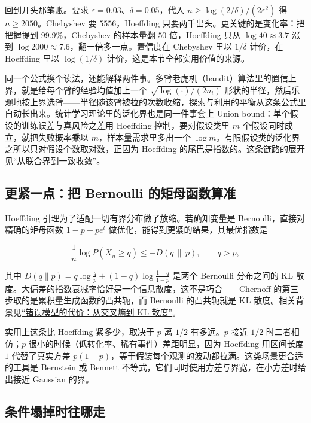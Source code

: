 回到开头那笔账。要求 \(\varepsilon=0.03\)、\(\delta=0.05\)，代入 \(n\ge\log(2/\delta)/(2\varepsilon^2)\) 得 \(n\ge2050\)。Chebyshev 要 \(5556\)，Hoeffding 只要两千出头。更关键的是变化率：把把握提到 \(99.9\%\)，Chebyshev 的样本量翻 \(50\) 倍，Hoeffding 只从 \(\log40\approx3.7\) 涨到 \(\log2000\approx7.6\)，翻一倍多一点。置信度在 Chebyshev 里以 \(1/\delta\) 计价，在 Hoeffding 里以 \(\log(1/\delta)\) 计价，这是本节全部实用价值的来源。

同一个公式换个读法，还能解释两件事。多臂老虎机（bandit）算法里的置信上界，就是给每个臂的经验均值加上一个 \(\sqrt{\log(\cdot)/(2n_i)}\) 形状的半径，然后乐观地按上界选臂——半径随该臂被拉的次数收缩，探索与利用的平衡从这条公式里自动长出来。统计学习理论里的泛化界也是同一件事套上 Union bound：单个假设的训练误差与真风险之差用 Hoeffding 控制，要对假设类里 \(m\) 个假设同时成立，就把失败概率乘以 \(m\)，样本量需求里多出一个 \(\log m\)。有限假设类的泛化界之所以只对假设个数取对数，正因为 Hoeffding 的尾巴是指数的。这条链路的展开见\hyperref[sec:13-Machine-Learning/10-Learning-Theory/02]{``从联合界到一致收敛''}。

\subsection{更紧一点：把 Bernoulli 的矩母函数算准}

Hoeffding 引理为了适配一切有界分布做了放缩。若确知变量是 Bernoulli，直接对精确的矩母函数 \(1-p+pe^t\) 做优化，能得到更紧的结果，其最优指数是

\[
\frac1n\log P(\bar X_n\ge q)\le-D(q\,\|\,p),\qquad q>p,
\]

其中 \(D(q\|p)=q\log\frac qp+(1-q)\log\frac{1-q}{1-p}\) 是两个 Bernoulli 分布之间的 KL 散度。大偏差的指数衰减率恰好是一个信息散度，这不是巧合——Chernoff 的第三步取的是累积量生成函数的凸共轭，而 Bernoulli 的凸共轭就是 KL 散度。相关背景见\hyperref[sec:07-Information-Theory/03-Divergences/01]{``错误模型的代价：从交叉熵到 KL 散度''}。

实用上这条比 Hoeffding 紧多少，取决于 \(p\) 离 \(1/2\) 有多远。\(p\) 接近 \(1/2\) 时二者相仿；\(p\) 很小的时候（低转化率、稀有事件）差距明显，因为 Hoeffding 用区间长度 \(1\) 代替了真实方差 \(p(1-p)\)，等于假装每个观测的波动都拉满。这类场景更合适的工具是 Bernstein 或 Bennett 不等式，它们同时使用方差与界宽，在小方差时给出接近 Gaussian 的界。

\subsection{条件塌掉时往哪走}

